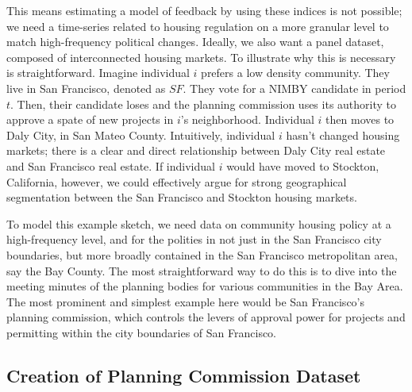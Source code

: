 \documentclass{article}
\begin{document}
This means estimating a model of feedback by using these indices is not possible; we need a time-series related to housing regulation on a more granular level to match high-frequency political changes. Ideally, we also want a panel dataset, composed of interconnected housing markets. To illustrate why this is necessary is straightforward. Imagine individual $i$ prefers a low density community. They live in San Francisco, denoted as $SF$. They vote for a NIMBY candidate in period $t$. Then, their candidate loses and the planning commission uses its authority to approve a spate of new projects in $i$'s neighborhood. Individual $i$ then moves to Daly City, in San Mateo County. Intuitively, individual $i$ hasn't changed housing markets; there is a clear and direct relationship between Daly City real estate and San Francisco real estate. If individual $i$ would have moved to Stockton, California, however, we could effectively argue for strong geographical segmentation between the San Francisco and Stockton housing markets. 

To model this example sketch, we need data on community housing policy at a high-frequency level, and for the polities in not just in the San Francisco city boundaries, but more broadly contained in the San Francisco metropolitan area, say the Bay County. The most straightforward way to do this is to dive into the meeting minutes of the planning bodies for various communities in the Bay Area. The most prominent and simplest example here would be San Francisco's planning commission, which controls the levers of approval power for projects and permitting within the city boundaries of San Francisco. 

\subsection{Creation of Planning Commission Dataset}
\end{document}
